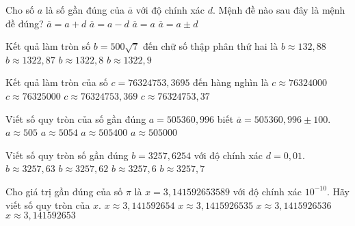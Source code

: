 \begin{ex}%
	Cho số $a$ là số gần đúng của $\overline{a}$ với độ chính xác $d$. Mệnh đề nào sau đây là mệnh đề đúng?
	\choice
	{$\overline{a}=a+d$}
	{$\overline{a}=a-d$}
	{$\overline{a}=a$}	
	{\True $\overline{a}=a\pm d$}
\end{ex}

\begin{ex}%
	Kết quả làm tròn số $b=500\sqrt{7}$ đến chữ số thập phân thứ hai là
	\choice
	{\True $b\approx 132,88$}
	{$b\approx 1322,87$}
	{$b\approx 1322,8 $}
	{$b\approx 1322,9 $}
\end{ex}

\begin{ex}%
	Kết quả làm tròn của số $c=76324753{,}3695$ đến  hàng nghìn là
	\choice
	{$c\approx 76324000$}
	{\True $c\approx 76325000$}
	{$c\approx 76324753{,}369$}
	{$c\approx 76324753{,}37$}
\end{ex}

\begin{ex}%
	Viết số quy tròn của số gần đúng $a=505360{,}996$ biết $\overline{a}=505360{,}996\pm 100$.
	\choice
	{$a\approx 505$}
	{$a\approx 5054$}
	{$a\approx 505400$}
	{\True $a\approx 505000$}
\end{ex}

\begin{ex}%
	Viết số quy tròn số gần đúng $b=3257{,}6254$ với độ chính xác $d=0{,}01$.
	\choice
	{$b\approx 3257{,}63$}
	{$b\approx 3257{,}62$}
	{\True $b\approx 3257{,}6$}
	{$b\approx 3257{,}7$}
\end{ex}

\begin{ex}%
	Cho giá trị gần đúng của số $\pi$ là $x=3{,}141592653589$ với độ chính xác $10^{-10}$. Hãy viết số quy tròn của $x$.
	\choice
	{\True $x\approx 3{,}141592654$}
	{$x\approx 3{,}1415926535$}
	{$x\approx 3{,}1415926536$}
	{$x\approx 3{,}141592653$}
\end{ex}

